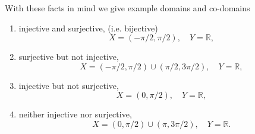 \documentclass[oneside,10pt]{memoir}
\begin{document}
\begin{enumerate}
\begin{solution}
With these facts in mind we give example domains and co-domains
\begin{enumerate}
\item
injective and surjective, (i.e. bijective)
$$X = (-\pi/2, \pi/2), \quad Y=\mathbb{R},$$
\item
surjective but not injective,
$$X = (-\pi/2, \pi/2) \cup (\pi/2, 3\pi/2), \quad Y=\mathbb{R},$$
\item
injective but not surjective,
$$X=(0,\pi/2), \quad Y=\mathbb{R},$$
\item
neither injective nor surjective,
$$X=(0,\pi/2) \cup (\pi, 3\pi/2), \quad Y=\mathbb{R}.$$
\end{enumerate}

\end{solution}




\end{enumerate}
\end{document}

